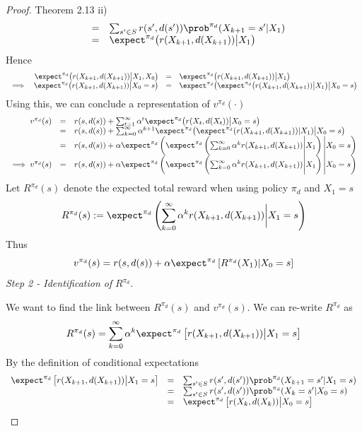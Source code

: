 \documentclass[11pt,a4paper]{article}
\begin{document}
\begin{proof}{Theorem 2.13 ii)}
\[\begin{array}{rcl}
      &=&\sum_{s'\in S}r(s',d(s'))\prob^{\pi_d}(X_{k+1}=s'|X_1)\\
      &=&\expect^{\pi_d}\big(r(X_{k+1},d(X_{k+1}))\big|X_1\big)
    \end{array}\]
    Hence
    \[\begin{array}{rrcl}
      &\expect^{\pi_d}\big(r(X_{k+1},d(X_{k+1}))\big|X_1,X_0\big)&=&\expect^{\pi_d}\big(r(X_{k+1},d(X_{k+1}))\big|X_1\big)\\
      \implies&\expect^{\pi_d}\big(r(X_{k+1},d(X_{k+1}))\big|X_0=s\big)&=&\expect^{\pi_d}\big(\expect^{\pi_d}\big(r(X_{k+1},d(X_{k+1}))\big|X_1\big)\big|X_0=s\big)
    \end{array}\]
    Using this, we can conclude a representation of $v^{\pi_d}(\cdot)$
    \[\begin{array}{rcl}
      v^{\pi_d}(s)&=&r(s,d(s))+\sum_{t=1}^\infty\alpha^t\expect^{\pi_d}\big(r(X_t,d(X_t))\big|X_0=s\big)\\
      &=&r(s,d(s))+\sum_{k=0}^\infty\alpha^{k+1}\expect^{\pi_d}\big(\expect^{\pi_d}(r(X_{k+1},d(X_{k+1}))|X_1)\big|X_0=s\big)\\
      &=&r(s,d(s))+\alpha\expect^{\pi_d}\left(\expect^{\pi_d}\left(\sum_{k=0}^\infty\alpha^kr(X_{k+1},d(X_{k+1}))\bigg|X_1\right)\bigg|X_0=s\right)\\
      \implies v^{\pi_d}(s)&=&r(s,d(s))+\alpha\expect^{\pi_d}\left(\expect^{\pi_d}\left(\sum_{k=0}^\infty\alpha^kr(X_{k+1},d(X_{k+1}))\bigg|X_1\right)\bigg|X_0=s\right)
    \end{array}\]
    Let $R^{\pi_d}(s)$ denote the expected total reward when using policy $\pi_d$ and $X_1=s$
    \[ R^{\pi_d}(s):=\expect^{\pi_d}\left(\sum_{k=0}^\infty\alpha^kr(X_{k+1},d(X_{k+1}))\bigg|X_1=s\right) \]
    Thus
    \[ v^{\pi_d}(s)=r(s,d(s))+\alpha\expect^{\pi_d}\left[R^{\pi_d}(X_1)|X_0=s\right] \]
    \textit{Step 2 - Identification of }$R^{\pi_d}$.
    \par We want to find the link between $R^{\pi_d}(s)$ and $v^{\pi_d}(s)$. We can re-write $R^{\pi_d}$ as
    \[ R^{\pi_d}(s)=\sum_{k=0}^\infty\alpha^k\expect^{\pi_d}\left[r(X_{k+1},d(X_{k+1}))\big|X_1=s\right] \]
    By the definition of conditional expectations
    \[\begin{array}{rcl}
      \expect^{\pi_d}\left[r(X_{k+1},d(X_{k+1}))\big|X_1=s\right]&=&\sum_{s'\in S}r(s',d(s'))\prob^{\pi_d}(X_{k+1}=s'|X_1=s)\\
      &=&\sum_{s'\in S}r(s',d(s'))\prob^{\pi_d}(X_k=s'|X_0=s)\\
      &=&\expect^{\pi_d}\left[r(X_k,d(X_k))\big|X_0=s\right]\\

\end{array}\]
\end{proof}
\end{document}
